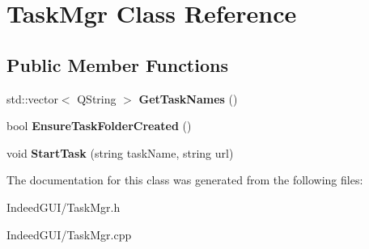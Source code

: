 \hypertarget{class_task_mgr}{}\section{Task\+Mgr Class Reference}
\label{class_task_mgr}
\subsection*{Public Member Functions}
\begin{DoxyCompactItemize}
\item 
\hypertarget{class_task_mgr_afe18c52fecd6dc2f7c22d5ef5b5a429b}{}std\+::vector$<$ Q\+String $>$ {\bfseries Get\+Task\+Names} ()\label{class_task_mgr_afe18c52fecd6dc2f7c22d5ef5b5a429b}

\item 
\hypertarget{class_task_mgr_a692985ca6f0da8200685559c0fd2115c}{}bool {\bfseries Ensure\+Task\+Folder\+Created} ()\label{class_task_mgr_a692985ca6f0da8200685559c0fd2115c}

\item 
\hypertarget{class_task_mgr_a4e625aa0b7791303527034b65afd1871}{}void {\bfseries Start\+Task} (string task\+Name, string url)\label{class_task_mgr_a4e625aa0b7791303527034b65afd1871}

\end{DoxyCompactItemize}


The documentation for this class was generated from the following files\+:\begin{DoxyCompactItemize}
\item 
Indeed\+G\+U\+I/Task\+Mgr.\+h\item 
Indeed\+G\+U\+I/Task\+Mgr.\+cpp\end{DoxyCompactItemize}
